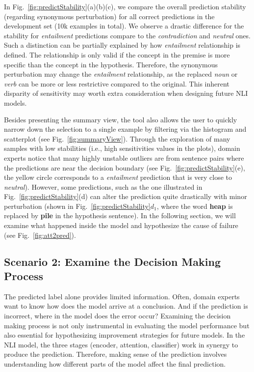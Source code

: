 In Fig.~\ref{fig:predictStability}(a)(b)(c), we compare the overall prediction stability (regarding synonymous perturbation) for all correct predictions in the development set (10k examples in total).
%
We observe a drastic difference for the stability for \emph{entailment} predictions compare to the \emph{contradiction} and \emph{neutral} ones.
%
Such a distinction can be partially explained by how \emph{entailment} relationship is defined. The relationship is only valid if the concept in the premise is more specific than the concept in the hypothesis. Therefore, the synonymous perturbation may change the \emph{entailment} relationship, as the replaced \emph{noun} or \emph{verb} can be more or less restrictive compared to the original.
This inherent disparity of sensitivity may worth extra consideration when designing future NLI models.

Besides presenting the summary view, the tool also allows the user to quickly narrow down the selection to a single example by filtering via the histogram and scatterplot (see Fig.~\ref{fig:summaryView}).
%
Through the exploration of many samples with low stabilities (i.e., high sensitivities values in the plots), domain experts notice that many highly unstable outliers are from sentence pairs where the predictions are near the decision boundary (see Fig.~\ref{fig:predictStability}(e), the yellow circle corresponds to a \emph{entailment} prediction that is very close to \emph{neutral}).
However, some predictions, such as the one illustrated in Fig.~\ref{fig:predictStability}(d) can alter the prediction quite drastically with minor perturbation (shown in Fig.~\ref{fig:predictStability}$d_1$, where the word \textbf{heap} is replaced by \textbf{pile} in the hypothesis sentence). In the following section, we will examine what happened inside the model and hypothesize the cause of failure (see Fig.~\ref{fig:att2pred}).

\subsection{Scenario 2: Examine the Decision Making Process}
The predicted label alone provides limited information. Often, domain experts want to know how does the model arrive at a conclusion. And if the prediction is incorrect, where in the model does the error occur?
Examining the decision making process is not only instrumental in evaluating the model performance but also essential for hypothesizing improvement strategies for future models.
%
In the NLI model, the three stages (encoder, attention, classifier) work in synergy to produce the prediction.
Therefore, making sense of the prediction involves understanding how different parts of the model affect the final prediction.

